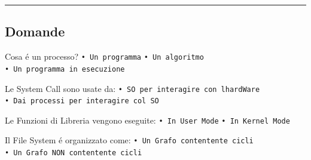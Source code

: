 \documentclass[]{article}
\begin{document}
\begin{center}\rule{0.5\linewidth}{0.5pt}\end{center}

\hypertarget{domande}{%
\subsection{Domande}\label{domande}}

Cosa é un processo? \texttt{•\ Un\ programma} \texttt{•\ Un\ algoritmo}
\texttt{•\ Un\ programma\ in\ esecuzione}

Le System Call sono usate da:
\texttt{•\ SO\ per\ interagire\ con\ l\textquotesingle{}hardWare}
\texttt{•\ Dai\ processi\ per\ interagire\ col\ SO}

Le Funzioni di Libreria vengono eseguite: \texttt{•\ In\ User\ Mode}
\texttt{•\ In\ Kernel\ Mode}

Il File System é organizzato come:
\texttt{•\ Un\ Grafo\ contentente\ cicli}
\texttt{•\ Un\ Grafo\ NON\ contentente\ cicli}
\end{document}
